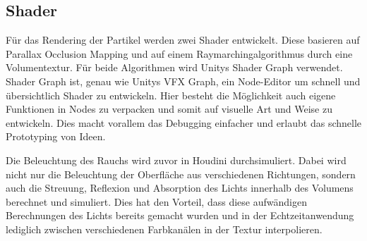 






\subsection{Shader}
Für das Rendering der Partikel werden zwei Shader entwickelt. Diese basieren auf Parallax Occlusion Mapping und auf einem Raymarchingalgorithmus
durch eine Volumentextur. Für beide Algorithmen wird Unitys Shader Graph verwendet. Shader Graph ist, genau wie Unitys VFX Graph, ein Node-Editor um
schnell und übersichtlich Shader zu entwickeln. Hier besteht die Möglichkeit auch eigene Funktionen in Nodes zu verpacken und somit auf visuelle Art und Weise zu entwickeln.
Dies macht vorallem das Debugging einfacher und erlaubt das schnelle Prototyping von Ideen.

Die Beleuchtung des Rauchs wird zuvor in Houdini durchsimuliert. Dabei wird nicht nur die Beleuchtung der Oberfläche aus verschiedenen Richtungen,
sondern auch die Streuung, Reflexion und Absorption des Lichts innerhalb des Volumens berechnet und simuliert.
Dies hat den Vorteil, dass diese aufwändigen Berechnungen des Lichts bereits gemacht wurden und in der Echtzeitanwendung lediglich zwischen verschiedenen
Farbkanälen in der Textur interpolieren.


